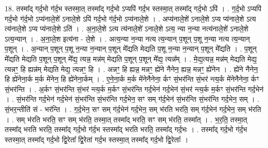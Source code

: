 \documentclass[17pt]{extarticle}
\begin{document}
18. तस्मा᳚द् गर्द॒भो ग॑र्द॒भ स्तस्मा॒त् तस्मा᳚द् गर्द॒भो ऽप्यपि॑ गर्द॒भ स्तस्मा॒त् तस्मा᳚द् गर्द॒भो ऽपि॑ । . ग॒र्द॒भो ऽप्यपि॑ गर्द॒भो ग॑र्द॒भो ऽप्य॑नाले॒शे॑ ऽनाले॒शे ऽपि॑ गर्द॒भो ग॑र्द॒भो ऽप्य॑नाले॒शे । . अप्य॑नाले॒शे॑ ऽनाले॒शे ऽप्य प्य॑नाले॒शे ऽत्य त्य॑नाले॒शे ऽप्य प्य॑नाले॒शे ऽति॑ । . अ॒ना॒ले॒शे ऽत्य त्य॑नाले॒शे॑ ऽनाले॒शे ऽत्य॒ न्या न॒न्या नत्य॑नाले॒शे॑ ऽनाले॒शे ऽत्य॒न्यान् । . अ॒ना॒ले॒श इत्य॑ना - ले॒शे । . अत्य॒न्या न॒न्या नत्य त्य॒न्यान् प॒शून् प॒शू न॒न्या नत्य त्य॒न्यान् प॒शून् । . अ॒न्यान् प॒शून् प॒शू न॒न्या न॒न्यान् प॒शून् मे᳚द्यति मेद्यति प॒शू न॒न्या न॒न्यान् प॒शून् मे᳚द्यति । . प॒शून् मे᳚द्यति मेद्यति प॒शून् प॒शून् मे᳚द्य॒ त्यन्न॒ मन्न॑म् मेद्यति प॒शून् प॒शून् मे᳚द्य॒ त्यन्न᳚म् । . मे॒द्य॒त्यन्न॒ मन्न॑म् मेद्यति मेद्य॒ त्यन्नꣳ॒॒ हि ह्यन्न॑म् मेद्यति मेद्य॒ त्यन्नꣳ॒॒ हि । . अन्नꣳ॒॒ हि ह्यन्न॒ मन्नꣳ॒॒ ह्ये॑ने नैनेन॒ ह्यन्न॒ मन्नꣳ॒॒ ह्ये॑नेन । . ह्ये॑ने नैनेन॒ हि ह्ये॑नेना॒र्क म॒र्क मे॑नेन॒ हि ह्ये॑नेना॒र्कम् । . ए॒ने॒ना॒र्क म॒र्क मे॑नेनैनेना॒ र्कꣳ सं॒भर॑न्ति सं॒भर॑ न्त्य॒र्क मे॑नेनैनेना॒ र्कꣳ सं॒भर॑न्ति । . अ॒र्कꣳ सं॒भर॑न्ति सं॒भर॑ न्त्य॒र्क म॒र्कꣳ सं॒भर॑न्ति गर्द॒भेन॑ गर्द॒भेन॑ सं॒भर॑ न्त्य॒र्क म॒र्कꣳ सं॒भर॑न्ति गर्द॒भेन॑ । . सं॒भर॑न्ति गर्द॒भेन॑ गर्द॒भेन॑ सं॒भर॑न्ति सं॒भर॑न्ति गर्द॒भेन॒ सꣳ सम् ग॑र्द॒भेन॑ सं॒भर॑न्ति सं॒भर॑न्ति गर्द॒भेन॒ सम् । . सं॒भर॒न्तीति॑ सं - भर॑न्ति । . ग॒र्द॒भेन॒ सꣳ सम् ग॑र्द॒भेन॑ गर्द॒भेन॒ सम् भ॑रति भरति॒ सम् ग॑र्द॒भेन॑ गर्द॒भेन॒ सम् भ॑रति । . सम् भ॑रति भरति॒ सꣳ सम् भ॑रति॒ तस्मा॒त् तस्मा᳚द् भरति॒ सꣳ सम् भ॑रति॒ तस्मा᳚त् । . भ॒र॒ति॒ तस्मा॒त् तस्मा᳚द् भरति भरति॒ तस्मा᳚द् गर्द॒भो ग॑र्द॒भ स्तस्मा᳚द् भरति भरति॒ तस्मा᳚द् गर्द॒भः । . तस्मा᳚द् गर्द॒भो ग॑र्द॒भ स्तस्मा॒त् तस्मा᳚द् गर्द॒भो द्वि॒रेता᳚ द्वि॒रेता॑ गर्द॒भ स्तस्मा॒त् तस्मा᳚द् गर्द॒भो द्वि॒रेताः᳚ । \newline
\end{document}
